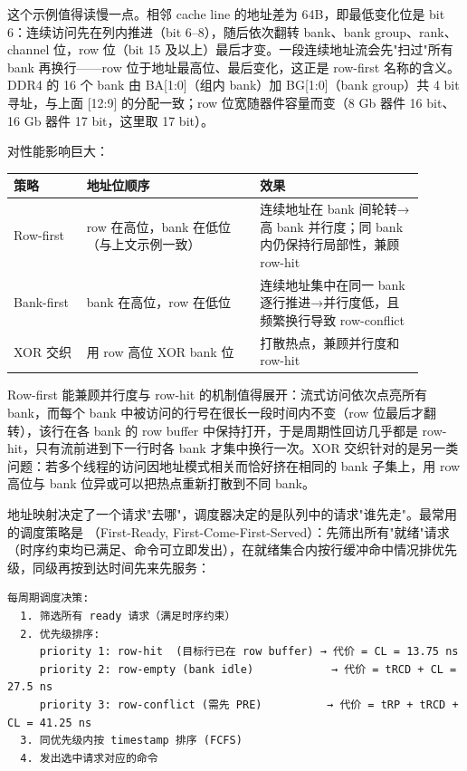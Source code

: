 这个示例值得读慢一点。相邻 cache line 的地址差为 64B，即最低变化位是 bit 6：连续访问先在列内推进（bit 6--8），随后依次翻转 bank、bank group、rank、channel 位，row 位（bit 15 及以上）最后才变。一段连续地址流会先"扫过"所有 bank 再换行——row 位于地址最高位、最后变化，这正是 row-first 名称的含义。DDR4 的 16 个 bank 由 BA[1:0]（组内 bank）加 BG[1:0]（bank group）共 4 bit 寻址，与上面 [12:9] 的分配一致；row 位宽随器件容量而变（8 Gb 器件 16 bit、16 Gb 器件 17 bit，这里取 17 bit）。

对性能影响巨大：

\begin{longtable}{L{0.16\linewidth}L{0.38\linewidth}L{0.36\linewidth}}
\toprule
策略 & 地址位顺序 & 效果 \\
\midrule
Row-first & row 在高位，bank 在低位（与上文示例一致） & 连续地址在 bank 间轮转→高 bank 并行度；同 bank 内仍保持行局部性，兼顾 row-hit \\
Bank-first & bank 在高位，row 在低位 & 连续地址集中在同一 bank 逐行推进→并行度低，且频繁换行导致 row-conflict \\
XOR 交织 & 用 row 高位 XOR bank 位 & 打散热点，兼顾并行度和 row-hit \\
\bottomrule
\end{longtable}

Row-first 能兼顾并行度与 row-hit 的机制值得展开：流式访问依次点亮所有 bank，而每个 bank 中被访问的行号在很长一段时间内不变（row 位最后才翻转），该行在各 bank 的 row buffer 中保持打开，于是周期性回访几乎都是 row-hit，只有流前进到下一行时各 bank 才集中换行一次。XOR 交织针对的是另一类问题：若多个线程的访问因地址模式相关而恰好挤在相同的 bank 子集上，用 row 高位与 bank 位异或可以把热点重新打散到不同 bank。



地址映射决定了一个请求"去哪"，调度器决定的是队列中的请求"谁先走"。最常用的调度策略是 （First-Ready, First-Come-First-Served）：先筛出所有"就绪"请求（时序约束均已满足、命令可立即发出），在就绪集合内按行缓冲命中情况排优先级，同级再按到达时间先来先服务：

\begin{lstlisting}
每周期调度决策:
  1. 筛选所有 ready 请求（满足时序约束）
  2. 优先级排序:
     priority 1: row-hit  (目标行已在 row buffer) → 代价 = CL = 13.75 ns
     priority 2: row-empty (bank idle)            → 代价 = tRCD + CL = 27.5 ns
     priority 3: row-conflict (需先 PRE)          → 代价 = tRP + tRCD + CL = 41.25 ns
  3. 同优先级内按 timestamp 排序 (FCFS)
  4. 发出选中请求对应的命令
\end{lstlisting}

